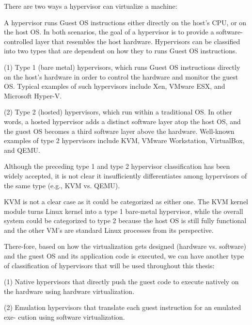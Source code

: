 \documentclass{report}
\begin{document}
\begin{spacing}{1.5}
{\large
There are two ways a hypervisor can virtualize a machine:

A hypervisor runs Guest OS instructions either directly on the host's CPU, or on the host OS. In both scenarios, 
the goal of a hypervisor is to provide a software-controlled layer that resembles the host hardware. Hypervisors 
can be classified into two types that are dependent on how they to runs Guest OS instructions.
\newline
}

{\large 
(1) Type 1 (bare metal) hypervisors, which runs Guest OS instructions directly on the host’s hardware in order to control
the hardware and monitor the guest OS. Typical examples of such hypervisors include Xen, VMware ESX, and Microsoft Hyper-V.
\newline
}

{\large
(2) Type 2 (hosted) hypervisors, which run within a traditional OS. In other words, a
hosted hypervisor adds a distinct software layer atop the host OS, and the guest OS becomes a third
software layer above the hardware. Well-known examples of type 2 hypervisors include KVM, 
VMware Workstation, VirtualBox, and QEMU.
\newline
}

{\large
Although the preceding type 1 and type 2 hypervisor classification has been widely
accepted, it is not clear it insufficiently differentiates among hypervisors of the same type (e.g., KVM vs. QEMU).


KVM is not a clear case as it could be categorized as either one. The KVM kernel module turns Linux kernel into a type 1 bare-metal hypervisor, while the overall system could be categorized to type 2 because the host OS is still fully functional and the other VM's are standard Linux processes from its perspective.


There-fore, based on how the virtualization gets designed (hardware vs. software) and the guest OS and its 
application code is executed, we can have another type of classification of hypervisors that will be used 
throughout this thesis:
\newline
}

{\large
(1) Native hypervisors that directly push the guest code to execute natively on the
hardware using hardware virtualization.
\newline
}


{\large
(2) Emulation hypervisors that translate each guest instruction for an emulated exe-
cution using software virtualization.
\newline
}


\end{spacing}
\end{document}
